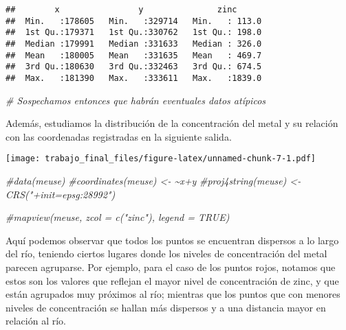 \documentclass[
  12pt,
]{article}
\newenvironment{Shaded}{\begin{snugshade}}{\end{snugshade}}
\newcommand{\CommentTok}[1]{\textcolor[rgb]{0.56,0.35,0.01}{\textit{#1}}}
\newcommand{\FunctionTok}[1]{\textcolor[rgb]{0.00,0.00,0.00}{#1}}
\newcommand{\NormalTok}[1]{#1}
\newcommand{\OtherTok}[1]{\textcolor[rgb]{0.56,0.35,0.01}{#1}}
\newcommand{\SpecialCharTok}[1]{\textcolor[rgb]{0.00,0.00,0.00}{#1}}
\begin{document}
\begin{verbatim}
##        x                y               zinc       
##  Min.   :178605   Min.   :329714   Min.   : 113.0  
##  1st Qu.:179371   1st Qu.:330762   1st Qu.: 198.0  
##  Median :179991   Median :331633   Median : 326.0  
##  Mean   :180005   Mean   :331635   Mean   : 469.7  
##  3rd Qu.:180630   3rd Qu.:332463   3rd Qu.: 674.5  
##  Max.   :181390   Max.   :333611   Max.   :1839.0
\end{verbatim}

\begin{Shaded}
\begin{Highlighting}[]
\CommentTok{\# Sospechamos entonces que habrán eventuales datos atípicos}
\end{Highlighting}
\end{Shaded}

Además, estudiamos la distribución de la concentración del metal y su
relación con las coordenadas registradas en la siguiente salida.

\begin{Shaded}
\end{Shaded}

\texttt{[image: trabajo\_final\_files/figure-latex/unnamed-chunk-7-1.pdf]}

\begin{Shaded}
\begin{Highlighting}[]
\CommentTok{\#data(meuse)}
\CommentTok{\#coordinates(meuse) \textless{}{-} \textasciitilde{}x+y}
\CommentTok{\#proj4string(meuse) \textless{}{-} CRS("+init=epsg:28992")}

\CommentTok{\#mapview(meuse, zcol = c("zinc"), legend = TRUE)}
\end{Highlighting}
\end{Shaded}

Aquí podemos observar que todos los puntos se encuentran dispersos a lo
largo del río, teniendo ciertos lugares donde los niveles de
concentración del metal parecen agruparse. Por ejemplo, para el caso de
los puntos rojos, notamos que estos son los valores que reflejan el
mayor nivel de concentración de zinc, y que están agrupados muy próximos
al río; mientras que los puntos que con menores niveles de concentración
se hallan más dispersos y a una distancia mayor en relación al río.
\end{document}
